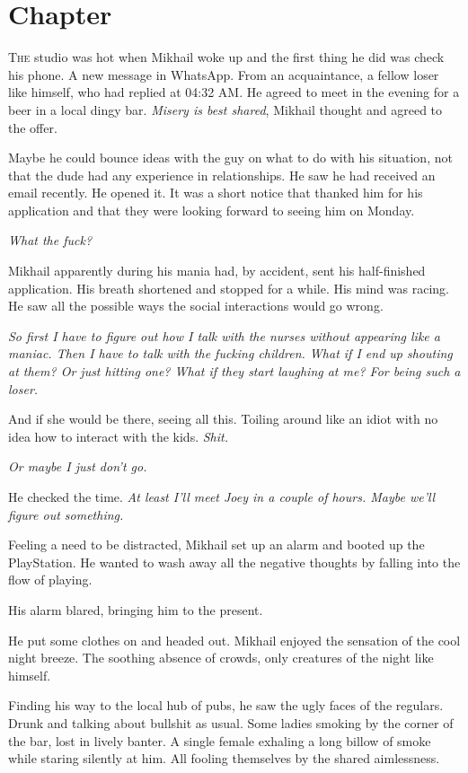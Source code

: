 \chapter{Chapter \thechapter}

\lettrine[lraise=0.1, nindent=0.1em, slope=-.5em]{T}{he} studio was hot when Mikhail woke up and the first thing he did was check his phone. A new message in WhatsApp. From an acquaintance, a fellow loser like himself, who had replied at 04:32 AM. He agreed to meet in the evening for a beer in a local dingy bar. \textit{Misery is best shared}, Mikhail thought and agreed to the offer.

Maybe he could bounce ideas with the guy on what to do with his situation, not that the dude had any experience in relationships. He saw he had received an email recently. He opened it. It was a short notice that thanked him for his application and that they were looking forward to seeing him on Monday.

\textit{What the fuck?}

Mikhail apparently during his mania had, by accident, sent his half-finished application. His breath shortened and stopped for a while. His mind was racing. He saw all the possible ways the social interactions would go wrong.

\textit{So first I have to figure out how I talk with the nurses without appearing like a maniac. Then I have to talk with the fucking children. What if I end up shouting at them? Or just hitting one? What if they start laughing at me? For being such a loser.}

And if she would be there, seeing all this. Toiling around like an idiot with no idea how to interact with the kids. \textit{Shit.}

\textit{Or maybe I just don’t go.}

He checked the time. \textit{At least I’ll meet Joey in a couple of hours. Maybe we’ll figure out something.}

Feeling a need to be distracted, Mikhail set up an alarm and booted up the PlayStation. He wanted to wash away all the negative thoughts by falling into the flow of playing.

His alarm blared, bringing him to the present.

He put some clothes on and headed out. Mikhail enjoyed the sensation of the cool night breeze. The soothing absence of crowds, only creatures of the night like himself.

Finding his way to the local hub of pubs, he saw the ugly faces of the regulars. Drunk and talking about bullshit as usual. Some ladies smoking by the corner of the bar, lost in lively banter. A single female exhaling a long billow of smoke while staring silently at him. All fooling themselves by the shared aimlessness.

